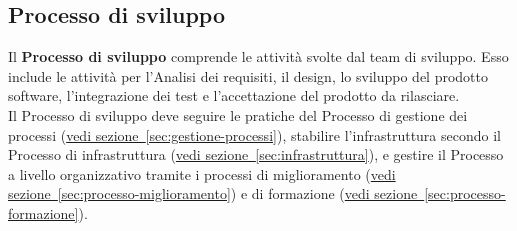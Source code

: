 \documentclass[a4paper,12pt]{article}
\begin{document}
\subsection{Processo di sviluppo} \label{sec:processo-sviluppo}
Il \textbf{Processo di sviluppo} comprende le attività svolte dal team di sviluppo. Esso include le attività per l'Analisi dei requisiti, il design, lo sviluppo del prodotto software, l'integrazione dei test e l'accettazione del prodotto da rilasciare.
\\Il Processo di sviluppo deve seguire le pratiche del Processo di gestione dei processi (\hyperref[sec:gestione-processi]{vedi sezione~\ref*{sec:gestione-processi}}), stabilire l'infrastruttura secondo il Processo di infrastruttura (\hyperref[sec:infrastruttura]{vedi sezione~\ref*{sec:infrastruttura}}), e gestire il Processo a livello organizzativo tramite i processi di miglioramento (\hyperref[sec:processo-miglioramento]{vedi sezione~\ref*{sec:processo-miglioramento}}) e di formazione (\hyperref[sec:processo-formazione]{vedi sezione~\ref*{sec:processo-formazione}}).
\end{document}
